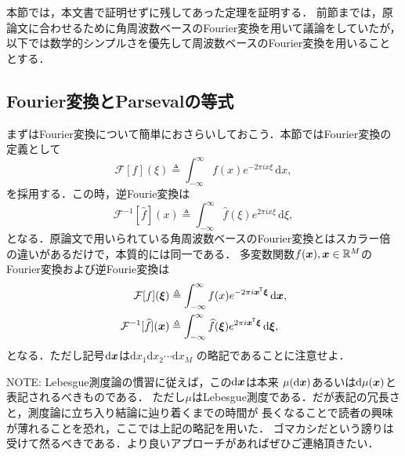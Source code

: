 %

本節では，本文書で証明せずに残してあった定理を証明する．
前節までは，原論文に合わせるために角周波数ベースのFourier変換を用いて議論をしていたが，
以下では数学的シンプルさを優先して周波数ベースのFourier変換を用いることとする．

\subsection*{Fourier変換とParsevalの等式}

まずはFourier変換について簡単におさらいしておこう．本節ではFourier変換の定義として
\begin{equation}
    \mathcal{F}[f](\xi) \triangleq \int_{-\infty}^{\infty}
    f(x) e^{-2\pi i x \xi} \, \mathrm{d}x,
    \label{eqn:def_fourier_transform}
\end{equation}
を採用する．この時，逆Fourie変換は
\begin{equation}
    \mathcal{F}^{-1}[\widehat{f}](x) \triangleq \int_{-\infty}^{\infty}
    \widehat{f}(\xi) e^{2\pi i x \xi} \, \mathrm{d}\xi,
\end{equation}
となる．原論文で用いられている角周波数ベースのFourier変換とはスカラー倍の違いがあるだけで，本質的には同一である．
多変数関数$f(\boldsymbol{x}), \boldsymbol{x} \in \mathbb{R}^M$のFourier変換および逆Fourie変換は
\begin{align}
    \mathcal{F}[f](\boldsymbol{\xi}) &\triangleq \int_{-\infty}^{\infty}
    f(x) e^{-2\pi i \boldsymbol{x}^{\mkern-1.5mu\mathsf{T}} \boldsymbol{\xi}} \, \mathrm{d}\boldsymbol{x}, \\
    \mathcal{F}^{-1}[\widehat{f}](\boldsymbol{x}) &\triangleq \int_{-\infty}^{\infty}
    \widehat{f}(\boldsymbol{\xi}) e^{2\pi i \boldsymbol{x}^{\mkern-1.5mu\mathsf{T}} \boldsymbol{\xi}} \, \mathrm{d}\boldsymbol{\xi},
\end{align}
となる．ただし記号$\mathrm{d}\boldsymbol{x}$は$\mathrm{d}x_1 \mathrm{d}x_2 \cdots \mathrm{d}x_M$
の略記であることに注意せよ．

\begin{displayquote}\footnotesize\textsf{NOTE:}
    Lebesgue測度論の慣習に従えば，この$\mathrm{d}\boldsymbol{x}$は本来
    $\mu(\mathrm{d}\boldsymbol{x})$あるいは$\mathrm{d}\mu(\boldsymbol{x})$と表記されるべきものである．
    ただし$\mu$はLebesgue測度である．だが表記の冗長さと，測度論に立ち入り結論に辿り着くまでの時間が
    長くなることで読者の興味が薄れることを恐れ，ここでは上記の略記を用いた．
    ゴマカシだという謗りは受けて然るべきである．より良いアプローチがあればぜひご連絡頂きたい．
\end{displayquote}

